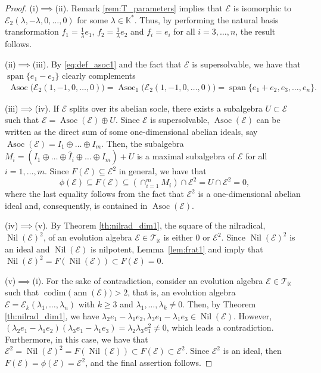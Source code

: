 \documentclass[12pt,reqno]{amsart}
\theoremstyle{definition}
\theoremstyle{remark}
\DeclareMathOperator{\ann}{ann}
\DeclareMathOperator{\spa}{span}
\DeclareMathOperator{\codim}{codim}
\DeclareMathOperator{\asoc}{Asoc}
\DeclareMathOperator{\nil}{Nil}
\numberwithin{equation}{section}
\begin{document}
\begin{proof}
	
	(i)$\implies$(ii). Remark \ref{rem:T_parameters} implies that $\mathcal{E}$ is isomorphic to $\mathcal{E}_2(\lambda,-\lambda,0,\dots,0)$ for some $\lambda\in\mathbb{K}^*$. Thus, by performing the natural basis transformation $f_1=\frac{1}{\lambda}e_1$,  $f_2=\frac{1}{\lambda}e_2$ and $f_i=e_i$ for all $i=3,\dots,n$, the result follows.
	
	(ii)$\implies$(iii). By \eqref{eq:def_asoc1} and the fact that $\mathcal{E}$ is supersolvable, we have that $\spa\{e_1-e_2\}$ clearly complements 
	\begin{align*}
		\asoc\big(\mathcal{E}_2(1,-1,0,\dots,0)\big)=\asoc_1\big(\mathcal{E}_2(1,-1,0,\dots,0)\big)=\spa\{e_1+e_2,e_3,\dots,e_n\}.
	\end{align*}	
	
	(iii)$\implies$(iv). If $\mathcal{E}$ splits over its abelian socle, there exists a subalgebra $U\subset\mathcal{E}$ such that $\mathcal{E}=\asoc(\mathcal{E})\oplus U$. Since $\mathcal{E}$ is supersolvable, $\asoc(\mathcal{E})$ can be written as the direct sum of some one-dimensional abelian ideals, say $\asoc(\mathcal{E})=I_1\oplus\dots\oplus I_m$. Then, the subalgebra $M_i=(I_1\oplus\dots\oplus\widehat{I}_i\oplus\dots\oplus I_m)+U$ is a maximal subalgebra of $\mathcal{E}$  for all $i=1,\dots,m$. Since $F(\mathcal{E})\subseteq\mathcal{E}^2$ in general, we have that 
	\[\phi(\mathcal{E})\subseteq F(\mathcal{E})\subseteq\left(\cap_{i=1}^mM_i\right)\cap\mathcal{E}^2=U\cap\mathcal{E}^2=0,\]
	where the last equality follows from the fact that $\mathcal{E}^2$ is a one-dimensional abelian ideal and, consequently, is contained in $\asoc(\mathcal{E})$.
	
	(iv)$\implies$(v). By Theorem \ref{th:nilrad_dim1}, the square of the nilradical, $\nil(\mathcal{E})^2$, of an evolution algebra $\mathcal{E}\in\mathcal{T}_\mathbb{K}$ is either $0$ or $\mathcal{E}^2$. Since $\nil(\mathcal{E})^2$ is an ideal and $\nil(\mathcal{E})$ is nilpotent, Lemma~\ref{lem:frat1} and \cite[Theorem 6]{T_71_frat} imply that $\nil(\mathcal{E})^2=F(\nil(\mathcal{E}))\subset F(\mathcal{E})=0$.
	
	(v)$\implies$(i). For the sake of contradiction, consider an evolution algebra $\mathcal{E}\in\mathcal{T}_\mathbb{K}$ such that $\codim\big(\ann(\mathcal{E})\big)>2$, that is, an evolution algebra $\mathcal{E}=\mathcal{E}_k(\lambda_1,\dots,\lambda_n)$ with $k\geq3$ and $\lambda_1,\dots,\lambda_k\neq0$. Then, by Theorem \ref{th:nilrad_dim1}, we have $\lambda_2e_1-\lambda_1e_2,\lambda_3e_1-\lambda_1e_3\in\nil(\mathcal{E})$. However, $(\lambda_2e_1-\lambda_1e_2)(\lambda_3e_1-\lambda_1e_3)=\lambda_2\lambda_3e_1^2\neq0$, which leads a contradiction. 
	Furthermore, in this case, we have that 
	$\mathcal{E}^2=\nil(\mathcal{E})^2=F(\nil(\mathcal{E}))\subset F(\mathcal{E})\subset\mathcal{E}^2$.
	Since $\mathcal{E}^2$ is an ideal, then $F(\mathcal{E})=\phi(\mathcal{E})=\mathcal{E}^2$, and the final assertion follows.
\end{proof}
\end{document}
